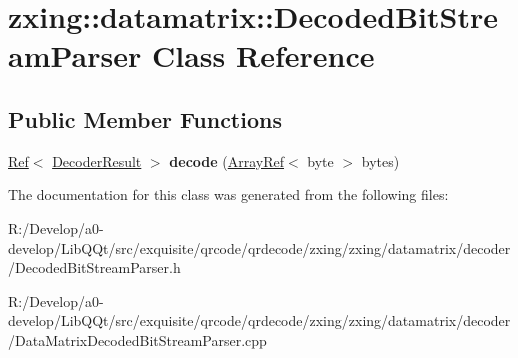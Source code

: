 \hypertarget{classzxing_1_1datamatrix_1_1_decoded_bit_stream_parser}{}\section{zxing\+:\+:datamatrix\+:\+:Decoded\+Bit\+Stream\+Parser Class Reference}
\label{classzxing_1_1datamatrix_1_1_decoded_bit_stream_parser}
\subsection*{Public Member Functions}
\begin{DoxyCompactItemize}
\item 
\mbox{\label{classzxing_1_1datamatrix_1_1_decoded_bit_stream_parser_aff04e769ee91cbad361e25b362044e12}} 
\mbox{\hyperlink{classzxing_1_1_ref}{Ref}}$<$ \mbox{\hyperlink{classzxing_1_1_decoder_result}{Decoder\+Result}} $>$ {\bfseries decode} (\mbox{\hyperlink{classzxing_1_1_array_ref}{Array\+Ref}}$<$ byte $>$ bytes)
\end{DoxyCompactItemize}


The documentation for this class was generated from the following files\+:\begin{DoxyCompactItemize}
\item 
R\+:/\+Develop/a0-\/develop/\+Lib\+Q\+Qt/src/exquisite/qrcode/qrdecode/zxing/zxing/datamatrix/decoder/Decoded\+Bit\+Stream\+Parser.\+h\item 
R\+:/\+Develop/a0-\/develop/\+Lib\+Q\+Qt/src/exquisite/qrcode/qrdecode/zxing/zxing/datamatrix/decoder/Data\+Matrix\+Decoded\+Bit\+Stream\+Parser.\+cpp\end{DoxyCompactItemize}
